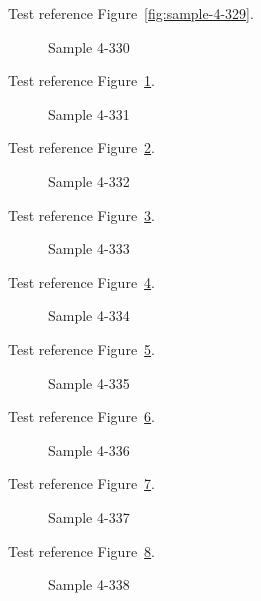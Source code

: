 Test reference Figure~\ref{fig:sample-4-329}.

\begin{figure}[tbhp]
\caption{Sample 4-330}
\label{fig:sample-4-330}
\end{figure}

Test reference Figure~\ref{fig:sample-4-330}.

\begin{figure}[tbhp]
\caption{Sample 4-331}
\label{fig:sample-4-331}
\end{figure}

Test reference Figure~\ref{fig:sample-4-331}.

\begin{figure}[tbhp]
\caption{Sample 4-332}
\label{fig:sample-4-332}
\end{figure}

Test reference Figure~\ref{fig:sample-4-332}.

\begin{figure}[tbhp]
\caption{Sample 4-333}
\label{fig:sample-4-333}
\end{figure}

Test reference Figure~\ref{fig:sample-4-333}.

\begin{figure}[tbhp]
\caption{Sample 4-334}
\label{fig:sample-4-334}
\end{figure}

Test reference Figure~\ref{fig:sample-4-334}.

\begin{figure}[tbhp]
\caption{Sample 4-335}
\label{fig:sample-4-335}
\end{figure}

Test reference Figure~\ref{fig:sample-4-335}.

\begin{figure}[tbhp]
\caption{Sample 4-336}
\label{fig:sample-4-336}
\end{figure}

Test reference Figure~\ref{fig:sample-4-336}.

\begin{figure}[tbhp]
\caption{Sample 4-337}
\label{fig:sample-4-337}
\end{figure}

Test reference Figure~\ref{fig:sample-4-337}.

\begin{figure}[tbhp]
\caption{Sample 4-338}
\label{fig:sample-4-338}
\end{figure}

